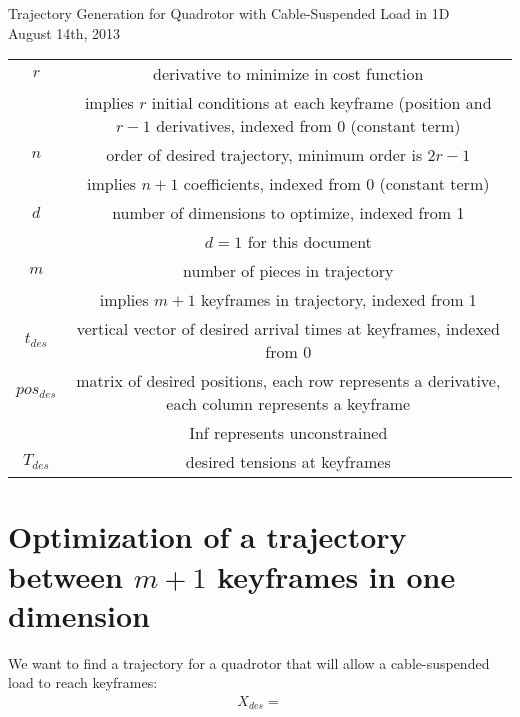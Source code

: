 \documentclass[11pt]{article}
\begin{document}
\centering
Trajectory Generation for Quadrotor with Cable-Suspended Load in 1D\\
August 14th, 2013

\raggedright

\begin{table} [h!]
\footnotesize
\begin{tabular}{ c c }
	$r$ & derivative to minimize in cost function \\
		& implies $r$ initial conditions at each keyframe (position and $r-1$ derivatives, indexed from 0 (constant term) \\
	$n$ & order of desired trajectory, minimum order is $2r-1$ \\
		&  implies $n+1$ coefficients, indexed from 0 (constant term) \\
	$d$ & number of dimensions to optimize, indexed from 1 \\
	 	& $d=1$ for this document \\
	$m$ & number of pieces in trajectory \\
		& implies $m+1$ keyframes in trajectory, indexed from 1 \\
	$t_{des}$ & vertical vector of desired arrival times at keyframes, indexed from 0 \\
	$pos_{des}$ & matrix of desired positions, each row represents a derivative, each column represents a keyframe \\
		&  Inf represents unconstrained  \\
         $T_{des}$ & desired tensions at keyframes
\end{tabular}
\label{tab: vars}
\end{table}




\newpage
\small



\newpage
\section{Optimization of a trajectory between $m+1$ keyframes in one dimension} \label{sec: mkeyframes1d}

We want to find a trajectory for a quadrotor that will allow a cable-suspended load to reach keyframes:
\begin{align*}
X_{des} = 
\end{align*}
\end{document}
